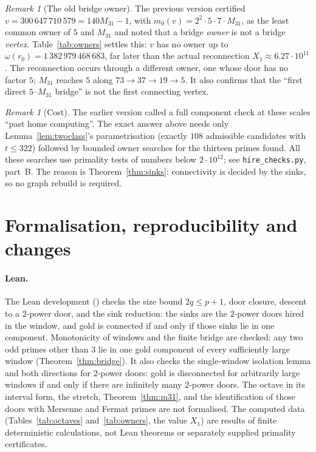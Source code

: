 \documentclass[11pt,a4paper]{article}
\theoremstyle{remark}
\newtheorem{remark}[theorem]{Remark}
\begin{document}
\begin{remark}[The old bridge owner]\label{rem:v}
The previous version certified \(v=300\,647\,710\,579=140M_{31}-1\), with \(m_0(v)=2^2\cdot5\cdot7\cdot M_{31}\), as the least common owner of \(5\) and \(M_{31}\) and noted that a bridge \emph{owner} is not a bridge \emph{vertex}.
Table~\ref{tab:owners} settles this: \(v\) has no owner up to \(\omega(r_0)=1\,382\,979\,468\,683\), far later than the actual reconnection \(X_1\approx6.27\cdot10^{11}\).
The reconnection occurs through a different owner, one whose door has no factor \(5\); \(M_{31}\) reaches \(5\) along \(73\to37\to19\to5\).
It also confirms that the ``first direct \(5\)--\(M_{31}\) bridge'' is not the first connecting vertex.
\end{remark}

\begin{remark}[Cost]
The earlier version called a full component check at these scales ``past home computing''.
The exact answer above needs only Lemma~\ref{lem:twoclass}'s parametrisation (exactly \(108\) admissible candidates with \(t\le322\)) followed by bounded owner searches for the thirteen primes found. All these searches use primality tests of numbers below \(2\cdot10^{12}\); see \texttt{hire\_checks.py}, part~B.
The reason is Theorem~\ref{thm:sinks}: connectivity is decided by the sinks, so no graph rebuild is required.
\end{remark}

\section{Formalisation, reproducibility and changes}

\paragraph{Lean.}
The Lean development () checks the size bound \(2q\le p+1\), door closure, descent to a \(2\)-power door, and the sink reduction: the sinks are the \(2\)-power doors hired in the window, and gold is connected if and only if those sinks lie in one component.
Monotonicity of windows and the finite bridge are checked: any two odd primes other than \(3\) lie in one gold component of every sufficiently large window (Theorem~\ref{thm:bridge}).
It also checks the single-window isolation lemma and both directions for \(2\)-power doors: gold is disconnected for arbitrarily large windows if and only if there are infinitely many \(2\)-power doors.
The octave in its interval form, the stretch, Theorem~\ref{thm:m31}, and the identification of those doors with Mersenne and Fermat primes are not formalised.
The computed data (Tables~\ref{tab:octaves} and~\ref{tab:owners}, the value \(X_1\)) are results of finite deterministic calculations, not Lean theorems or separately supplied primality certificates.
\end{document}
